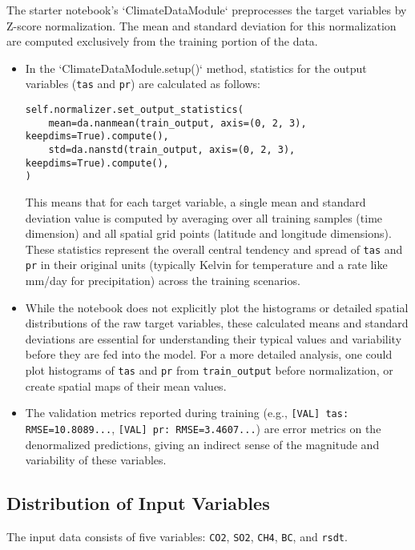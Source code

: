 \documentclass{article}
\begin{document}
The starter notebook's `ClimateDataModule` preprocesses the target variables by Z-score normalization. The mean and standard deviation for this normalization are computed exclusively from the training portion of the data.
\begin{itemize}
    \item In the `ClimateDataModule.setup()` method, statistics for the output variables (\texttt{tas} and \texttt{pr}) are calculated as follows:
    \begin{verbatim}
self.normalizer.set_output_statistics(
    mean=da.nanmean(train_output, axis=(0, 2, 3), keepdims=True).compute(),
    std=da.nanstd(train_output, axis=(0, 2, 3), keepdims=True).compute(),
)
    \end{verbatim}
    This means that for each target variable, a single mean and standard deviation value is computed by averaging over all training samples (time dimension) and all spatial grid points (latitude and longitude dimensions). These statistics represent the overall central tendency and spread of \texttt{tas} and \texttt{pr} in their original units (typically Kelvin for temperature and a rate like mm/day for precipitation) across the training scenarios.
    \item While the notebook does not explicitly plot the histograms or detailed spatial distributions of the raw target variables, these calculated means and standard deviations are essential for understanding their typical values and variability before they are fed into the model. For a more detailed analysis, one could plot histograms of \texttt{tas} and \texttt{pr} from \texttt{train\_output} before normalization, or create spatial maps of their mean values.
    \item The validation metrics reported during training (e.g., \texttt{[VAL] tas: RMSE=10.8089...}, \texttt{[VAL] pr: RMSE=3.4607...}) are error metrics on the denormalized predictions, giving an indirect sense of the magnitude and variability of these variables.
\end{itemize}

\subsection{Distribution of Input Variables}

The input data consists of five variables: \texttt{CO2}, \texttt{SO2}, \texttt{CH4}, \texttt{BC}, and \texttt{rsdt}.
\end{document}

